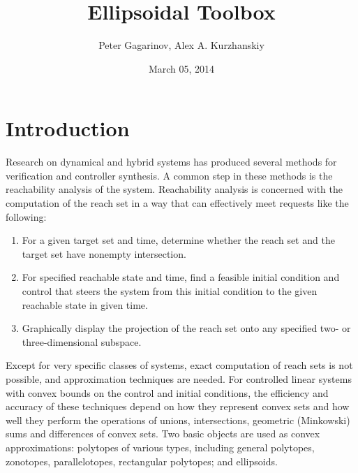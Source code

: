 \documentclass[letterpaper,10pt,english]{sphinxmanual}
\title{Ellipsoidal Toolbox}
\date{March 05, 2014}
\author{Peter Gagarinov, Alex A. Kurzhanskiy}
\begin{document}
\maketitle
\tableofcontents
{}\label{main_manual::doc}



\chapter{Introduction}
\label{chap_intro:introduction}\label{chap_intro::doc}\label{chap_intro:welcome-to-ellipsoidal-toolbox-documentation}
Research on dynamical and hybrid systems has produced several methods
for verification and controller synthesis. A common step in these
methods is the reachability analysis of the system. Reachability
analysis is concerned with the computation of the reach set in a way
that can effectively meet requests like the following:
\begin{enumerate}
\item {} 
For a given target set and time, determine whether the reach set and
the target set have nonempty intersection.

\item {} 
For specified reachable state and time, find a feasible initial
condition and control that steers the system from this initial
condition to the given reachable state in given time.

\item {} 
Graphically display the projection of the reach set onto any
specified two- or three-dimensional subspace.

\end{enumerate}

Except for very specific classes of systems, exact computation of reach
sets is not possible, and approximation techniques are needed. For
controlled linear systems with convex bounds on the control and initial
conditions, the efficiency and accuracy of these techniques depend on
how they represent convex sets and how well they perform the operations
of unions, intersections, geometric (Minkowski) sums and differences of
convex sets. Two basic objects are used as convex approximations:
polytopes of various types, including general polytopes, zonotopes,
parallelotopes, rectangular polytopes; and ellipsoids.
\end{document}
